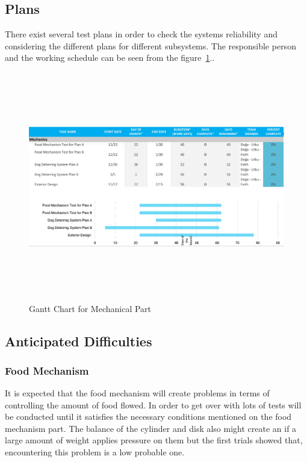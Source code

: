 \newpage
\subsection{Plans}

There exist several test plans in order to check the systems reliability and considering the different plans for different subsystems. The responsible person and the working schedule can be seen from the figure~\ref{fig:GanttChart for Mechanical Part}..
\begin{figure}[tbh]
    \centering
    \includegraphics[width=15cm, height=10cm]{img/mekanikganttchart.jpg}
    \caption{Gantt Chart for Mechanical Part}
    \label{fig:GanttChart for Mechanical Part}
\end{figure}




\subsection{Anticipated Difficulties}
\subsubsection{Food Mechanism}
It is expected that the food mechanism will create problems in terms of controlling the amount of food flowed. In order to get over with lots of tests will be conducted until it satisfies the necessary conditions mentioned on the food mechanism part.
The balance of the cylinder and disk also might create an if a large amount of weight applies pressure on them but the first trials showed that, encountering this problem is a low probable one.
